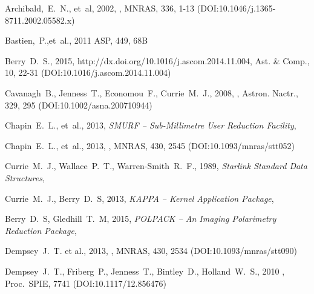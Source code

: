 \documentclass[11pt,oneside,chapters]{starlink}
\begin{document}
\begin{thebibliography}{}



Archibald,~E.~N., et~al, 2002, , MNRAS, 336, 1-13
(DOI:10.1046/j.1365-8711.2002.05582.x)

Bastien,~P.,et~al., 2011   ASP, 449, 68B

Berry~D.~S.,  2015,
{http://dx.doi.org/10.1016/j.ascom.2014.11.004},
Ast. \& Comp., 10, 22-31 (DOI:10.1016/j.ascom.2014.11.004)

Cavanagh~B., Jenness~T., Economou~F., Currie~M.~J., 2008,
, Astron. Nactr., 329, 295
(DOI:10.1002/asna.200710944)

Chapin~E.~L., et~al., 2013, \textit{SMURF -- Sub-Millimetre User Reduction
Facility}, 

Chapin~E.~L., et~al., 2013,
,
MNRAS, 430, 2545 (DOI:10.1093/mnras/stt052)

Currie~M.~J., Wallace~P.~T., Warren-Smith~R.~F., 1989,
\textit{Starlink Standard Data Structures}, 

Currie~M.~J., Berry~D.~S, 2013, \textit{KAPPA -- Kernel Application Package},

Berry~D.~S, Gledhill~T.~M, 2015, \textit{POLPACK -- An Imaging Polarimetry Reduction Package},

Dempsey~J.~T. et al., 2013, ,
MNRAS, 430, 2534 (DOI:10.1093/mnras/stt090)

Dempsey~J.~T., Friberg~P., Jenness~T., Bintley~D., Holland~W.~S., 2010
,
Proc.\ SPIE, 7741 (DOI:10.1117/12.856476)


\end{thebibliography}
\end{document}
